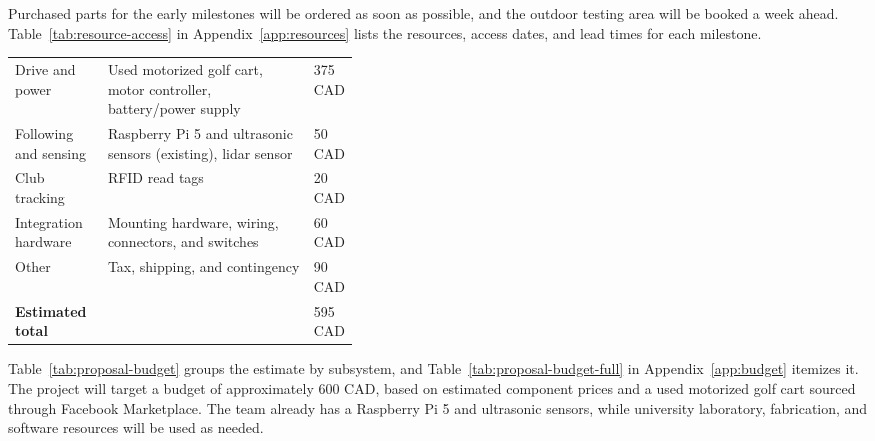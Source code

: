 \label{sec:resources}

Purchased parts for the early milestones will be ordered as soon as possible, and the outdoor testing area will be booked a week ahead. Table~\ref{tab:resource-access} in Appendix~\ref{app:resources} lists the resources, access dates, and lead times for each milestone.



\begin{TableBlock}
\small
{}\label{tab:proposal-budget}
\begin{tabularx}{\linewidth}{@{}L{0.27\linewidth} Y L{0.13\linewidth}@{}}
 &  &  \\
\midrule
Drive and power & Used motorized golf cart, motor controller, battery/power supply & 375 CAD \\
Following and sensing & Raspberry Pi 5 and ultrasonic sensors (existing), lidar sensor & 50 CAD \\
Club tracking & RFID read tags & 20 CAD \\
Integration hardware & Mounting hardware, wiring, connectors, and switches & 60 CAD \\
Other & Tax, shipping, and contingency & 90 CAD \\
\midrule
\textbf{Estimated total} & & 595 CAD \\
\bottomrule
\end{tabularx}
\end{TableBlock}

Table~\ref{tab:proposal-budget} groups the estimate by subsystem, and Table~\ref{tab:proposal-budget-full} in Appendix~\ref{app:budget} itemizes it. The project will target a budget of approximately 600 CAD, based on estimated component prices and a used motorized golf cart sourced through Facebook Marketplace. The team already has a Raspberry Pi 5 and ultrasonic sensors, while university laboratory, fabrication, and software resources will be used as needed.
